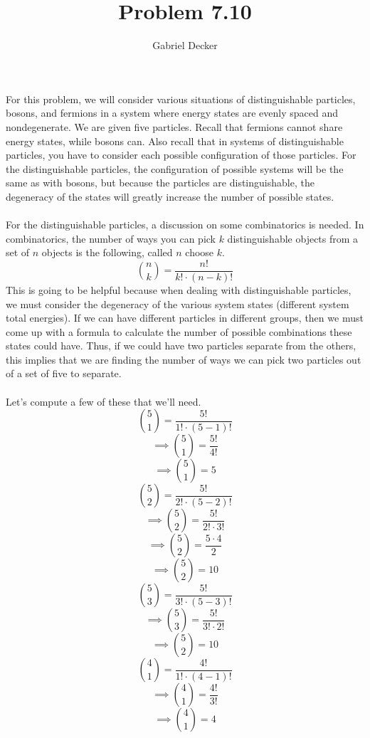 \documentclass[12pt]{article}
\title{Problem 7.10}
\author{Gabriel Decker}
\begin{document}
\maketitle
\begin{flushleft}


For this problem, we will consider various situations of distinguishable particles, bosons, and fermions in a system where energy states are evenly spaced and nondegenerate.
We are given five particles.
Recall that fermions cannot share energy states, while bosons can.
Also recall that in systems of distinguishable particles, you have to consider each possible configuration of those particles.
For the distinguishable particles, the configuration of possible systems will be the same as with bosons, but because the particles are distinguishable, the degeneracy of the states will greatly increase the number of possible states.\\~\\

For the distinguishable particles, a discussion on some combinatorics is needed.
In combinatorics, the number of ways you can pick $k$ distinguishable objects from a set of $n$ objects is the following, called $n$ choose $k$.
\begin{equation}
    \left.n\choose k\right.=\frac{n!}{k!\cdot(n-k)!}
\end{equation}
This is going to be helpful because when dealing with distinguishable particles, we must consider the degeneracy of the various system states (different system total energies).
If we can have different particles in different groups, then we must come up with a formula to calculate the number of possible combinations these states could have.
Thus, if we could have two particles separate from the others, this implies that we are finding the number of ways we can pick two particles out of a set of five to separate.\\~\\

Let's compute a few of these that we'll need.
$$\left.5\choose 1\right.=\frac{5!}{1!\cdot(5-1)!}$$
$$\implies\left.5\choose 1\right.=\frac{5!}{4!}$$
$$\implies\left.5\choose 1\right.=5$$
$$\left.5\choose 2\right.=\frac{5!}{2!\cdot(5-2)!}$$
$$\implies\left.5\choose 2\right.=\frac{5!}{2!\cdot3!}$$
$$\implies\left.5\choose 2\right.=\frac{5\cdot4}{2}$$
$$\implies\left.5\choose 2\right.=10$$
$$\left.5\choose 3\right.=\frac{5!}{3!\cdot(5-3)!}$$
$$\implies\left.5\choose 3\right.=\frac{5!}{3!\cdot2!}$$
$$\implies\left.5\choose 2\right.=10$$
$$\left.4\choose 1\right.=\frac{4!}{1!\cdot(4-1)!}$$
$$\implies\left.4\choose 1\right.=\frac{4!}{3!}$$
$$\implies\left.4\choose 1\right.=4$$



\end{flushleft}
\end{document}
